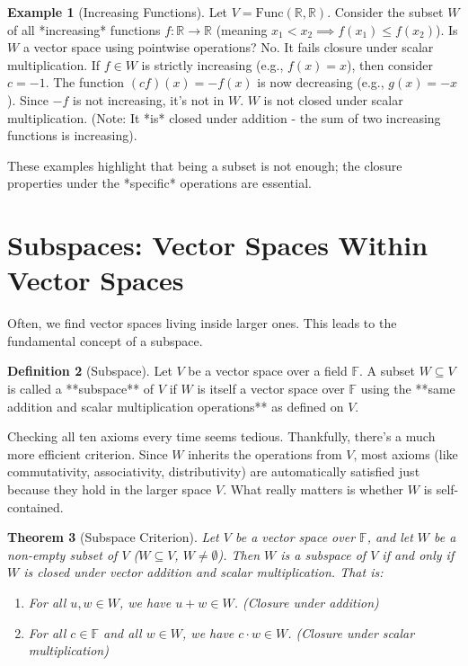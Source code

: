 \documentclass[11pt]{article}
\newtheorem{theorem}{Theorem}[section]
\theoremstyle{definition}
\newtheorem{definition}[theorem]{Definition}
\newtheorem{example}[theorem]{Example}
\theoremstyle{remark}
\newcommand{\R}{\mathbb{R}}
\newcommand{\F}{\mathbb{F}} %
\newcommand{\Func}[2]{\mathrm{Func}(#1, #2)}
\begin{document}
\begin{example}[Increasing Functions]
Let $V = \Func{\R}{\R}$. Consider the subset $W$ of all *increasing* functions $f: \R \to \R$ (meaning $x_1 < x_2 \implies f(x_1) \le f(x_2)$). Is $W$ a vector space using pointwise operations?
No. It fails closure under scalar multiplication. If $f \in W$ is strictly increasing (e.g., $f(x)=x$), then consider $c = -1$. The function $(c f)(x) = -f(x)$ is now decreasing (e.g., $g(x)=-x$). Since $-f$ is not increasing, it's not in $W$. $W$ is not closed under scalar multiplication.
(Note: It *is* closed under addition - the sum of two increasing functions is increasing).
\end{example}

These examples highlight that being a subset is not enough; the closure properties under the *specific* operations are essential.

\section{Subspaces: Vector Spaces Within Vector Spaces}

Often, we find vector spaces living inside larger ones. This leads to the fundamental concept of a subspace.

\begin{definition}[Subspace]
Let $V$ be a vector space over a field $\F$. A subset $W \subseteq V$ is called a **subspace** of $V$ if $W$ is itself a vector space over $\F$ using the **same addition and scalar multiplication operations** as defined on $V$.
\end{definition}

Checking all ten axioms every time seems tedious. Thankfully, there's a much more efficient criterion. Since $W$ inherits the operations from $V$, most axioms (like commutativity, associativity, distributivity) are automatically satisfied just because they hold in the larger space $V$. What really matters is whether $W$ is self-contained.

\begin{theorem}[Subspace Criterion] \label{thm:subspace_criterion}
Let $V$ be a vector space over $\F$, and let $W$ be a non-empty subset of $V$ ($W \subseteq V$, $W \neq \emptyset$). Then $W$ is a subspace of $V$ if and only if $W$ is closed under vector addition and scalar multiplication. That is:
\begin{enumerate}
    \item For all $u, w \in W$, we have $u + w \in W$. (Closure under addition)
    \item For all $c \in \F$ and all $w \in W$, we have $c \cdot w \in W$. (Closure under scalar multiplication)
\end{enumerate}
\end{theorem}
\end{document}
